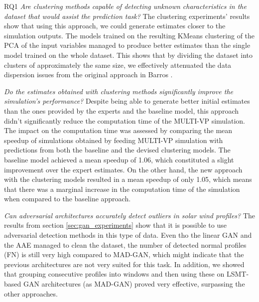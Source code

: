 \begin{description}
    \item{RQ1} \textit{Are clustering methods capable of detecting unknown characteristics in the dataset that would assist the prediction task?} The clustering experiments' results show that using this approach, we could generate estimates closer to the simulation outputs. The models trained on the resulting KMeans clustering of the PCA of the input variables managed to produce better estimates than the single model trained on the whole dataset. This shows that by dividing the dataset into clusters of approximately the same size, we effectively attenuated the data dispersion issues from the original approach in Barros \cite{barros_InitialConditionEstimation_}.

    \item[RQ2] \textit{Do the estimates obtained with clustering methods significantly improve the simulation’s
performance?} Despite being able to generate better initial estimates than the ones provided by the experts and the baseline model, this approach didn't significantly reduce the computation time of the MULTI-VP simulation. The impact on the computation time was assessed by comparing the mean speedup of simulations obtained by feeding MULTI-VP simulation with predictions from both the baseline and the devised clustering models. The baseline model achieved a mean speedup of 1.06, which constituted a slight improvement over the expert estimates. On the other hand, the new approach with the clustering models resulted in a mean speedup of only 1.05, which means that there was a marginal increase in the computation time of the simulation when compared to the baseline approach.

    \item[RQ3] \textit{Can adversarial architectures accurately detect outliers in solar wind profiles?} The results from section \ref{sec:gan_experiments} show that it is possible to use adversarial detection methods in this type of data. Even tho the linear GAN and the AAE managed to clean the dataset, the number of detected normal profiles (FN) is still very high compared to MAD-GAN, which might indicate that the previous architectures are not very suited for this task. In addition, we showed that grouping consecutive profiles into windows and then using these on LSMT-based GAN architectures (as MAD-GAN) proved very effective, surpassing the other approaches.


\end{description}
